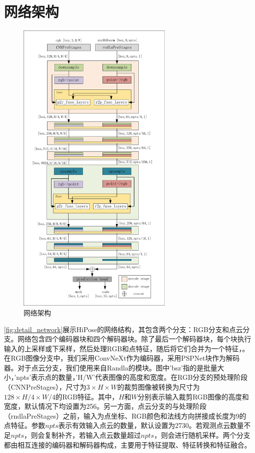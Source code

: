 \section{网络架构}

\begin{figure}[htbp]
    \centering
    \includegraphics[width=0.68\textwidth]{figure/hipose/network.pdf}
    \caption{网络架构}
    \label{fig:detail_network}
\end{figure}

\autoref{fig:detail_network}展示HiPose的网络结构，其包含两个分支：RGB分支和点云分支。网络包含四个编码器块和四个解码器块。除了最后一个解码器块，每个块执行输入的上采样或下采样，然后处理RGB和点特征，随后将它们合并为一个特征，。在RGB图像分支中，我们采用ConvNeXt\cite{Liu2022ACF}作为编码器，采用PSPNet块\cite{zhao2017pyramid}作为解码器。对于点云分支，我们使用来自Randla\cite{hu2020randla}的模块。图中'bsz'指的是批量大小，'npts'表示点的数量，'H/W'代表图像的高度和宽度。在RGB分支的预处理阶段（CNNPreStages），尺寸为$3 \times H \times W$的裁剪图像被转换为尺寸为$128 \times H/4 \times W/4$的RGB特征。其中，$H$和$W$分别表示输入裁剪RGB图像的高度和宽度，默认情况下均设置为256。另一方面，点云分支的与处理阶段（rndlaPreStages）之前，输入为点坐标、RGB颜色和法线方向拼接成长度为9的点特征。参数$npts$表示有效输入点云的数量，默认设置为2730。若观测点云数量不足$npts$，则会复制补齐，若输入点云数量超过$npts$，则会进行随机采样。两个分支都由相互连接的编码器和解码器构成，主要用于特征提取、特征转换和特征融合。

